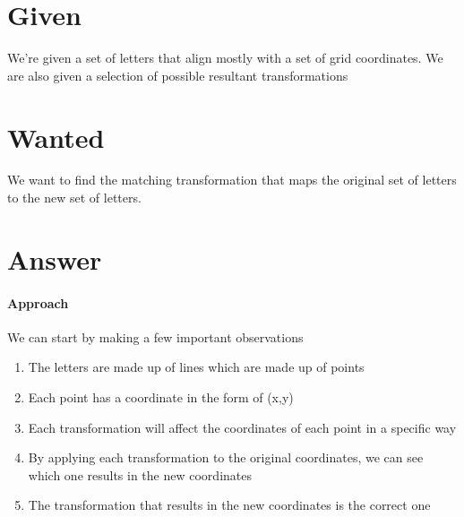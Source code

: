 \documentclass{article}
\begin{document}
\section{Given}
    We're given a set of letters that align mostly with a set of grid coordinates.
    We are also given a selection of possible resultant transformations
\section{Wanted}
    We want to find the matching transformation that maps the original set of letters to the new set of letters.
\section{Answer}
    \paragraph{Approach}
        We can start by making a few important observations
        \begin{enumerate}
            \item The letters are made up of lines which are made up of points
            \item Each point has a coordinate in the form of (x,y)
            \item Each transformation will affect the coordinates of each point in a specific way
            \item By applying each transformation to the original coordinates, we can see which one results in the new coordinates
            \item The transformation that results in the new coordinates is the correct one
        \end{enumerate}
\end{document}
